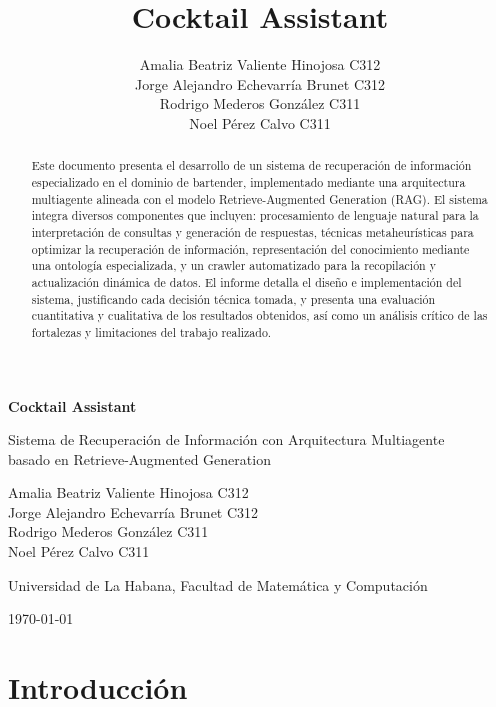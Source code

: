 \documentclass[runningheads]{llncs}
\title{Cocktail Assistant}
\author{Amalia Beatriz Valiente Hinojosa C312 \\
        Jorge Alejandro Echevarría Brunet C312 \\
        Rodrigo Mederos González C311 \\
        Noel Pérez Calvo C311}
\institute{Universidad de La Habana, Facultad de Matemática y Computación\\}
\begin{document}
\thispagestyle{empty}
\begin{center}
  \vspace*{3em}
  
  \huge{\textbf{Cocktail Assistant}}
  \vspace{1em}
  
  \large{Sistema de Recuperación de Información con Arquitectura Multiagente\\
  basado en Retrieve-Augmented Generation}
  
  \vspace{2em}
  
  \large{
    Amalia Beatriz Valiente Hinojosa C312 \\
        Jorge Alejandro Echevarría Brunet C312 \\
        Rodrigo Mederos González C311 \\
        Noel Pérez Calvo C311
  }
  
  \vspace{1em}
  
  \normalsize{Universidad de La Habana, Facultad de Matemática y Computación}
  
  
  
  \vspace{1em}
  \normalsize{\today}
\end{center}

\setcounter{page}{1}

\begin{abstract}
Este documento presenta el desarrollo de un sistema de recuperación de información especializado en el dominio de bartender, implementado mediante una arquitectura multiagente alineada con el modelo Retrieve-Augmented Generation (RAG). El sistema integra diversos componentes que incluyen: procesamiento de lenguaje natural para la interpretación de consultas y generación de respuestas, técnicas metaheurísticas para optimizar la recuperación de información, representación del conocimiento mediante una ontología especializada, y un crawler automatizado para la recopilación y actualización dinámica de datos. El informe detalla el diseño e implementación del sistema, justificando cada decisión técnica tomada, y presenta una evaluación cuantitativa y cualitativa de los resultados obtenidos, así como un análisis crítico de las fortalezas y limitaciones del trabajo realizado.
\end{abstract}

\section{Introducción}
\end{document}
